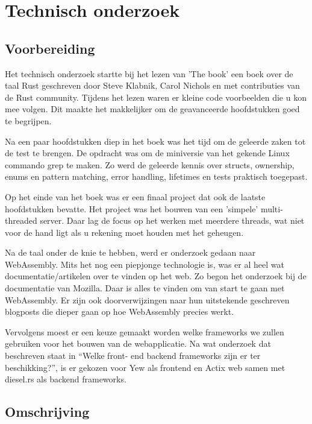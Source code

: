 \chapter{Technisch onderzoek}

\section{Voorbereiding}

Het technisch onderzoek startte bij het lezen van 'The book' een boek over de taal Rust geschreven
door Steve Klabnik, Carol Nichols en met contributies van de Rust community. Tijdens het lezen waren
er kleine code voorbeelden die u kon mee volgen. Dit maakte het makkelijker om de geavanceerde
hoofdstukken goed te begrijpen. 

Na een paar hoofdstukken diep in het boek was het tijd om de geleerde zaken tot de test te brengen.
De opdracht was om de miniversie van het gekende Linux commando grep te maken. Zo werd de geleerde
kennis over structs, ownership, enums en pattern matching, error handling, lifetimes en tests
praktisch toegepast.  

Op het einde van het boek was er een finaal project dat ook de laatste hoofdstukken bevatte. Het
project was het bouwen van een 'simpele' multi-threaded server. Daar lag de focus op het werken met
meerdere threads, wat niet voor de hand ligt als u rekening moet houden met het geheugen. 

Na de taal onder de knie te hebben, werd er onderzoek gedaan naar WebAssembly. Mits het nog een
piepjonge technologie is, was er al heel wat documentatie/artikelen over te vinden op het web. Zo
begon het onderzoek bij de documentatie van Mozilla. Daar is alles te vinden om van start te gaan
met WebAssembly. Er zijn ook doorverwijzingen naar hun uitstekende geschreven blogposts die dieper
gaan op hoe WebAssembly precies werkt.

Vervolgens moest er een keuze gemaakt worden welke frameworks we zullen gebruiken voor het bouwen
van de webapplicatie. Na wat onderzoek dat beschreven staat in \enquote{Welke front- end backend
frameworks zijn er ter beschikking?}, is er gekozen voor Yew als frontend en Actix web samen met
diesel.rs als backend frameworks.

\clearpage

\section{Omschrijving}

